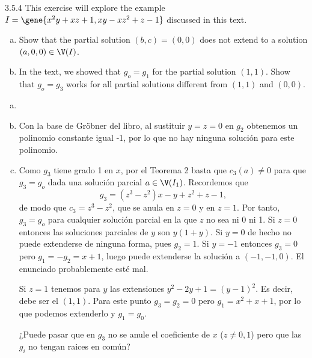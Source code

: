 \documentclass[twoside]{article}
\begin{document}
\begin{ejercicio}{3.5.4}
This exercise will explore the example $I = \gene{x^2y+xz+1, xy-xz^2+z-1}$ discussed in this text.
\begin{enumerate}[a.]
\item Show that the partial solution $(b,c) = (0,0)$ does not extend to a solution $(a,0,0) \in \V(I)$.
\item In the text, we showed that $g_o = g_1$ for the partial solution $(1,1)$.
Show that $g_o = g_3$ works for all partial solutions different from $(1,1)$ and $(0,0)$.
\end{enumerate}
\end{ejercicio}
\begin{solucion}
\begin{enumerate}[a.]
\item[]
\item Con la base de Gröbner del libro, al sustituir $y=z=0$ en $g_2$ obtenemos un polinomio constante igual -1, por lo que no hay ninguna solución para este polinomio. 
\item Como $g_3$ tiene grado 1 en $x$, por el Teorema 2 basta que $c_3(a)\neq 0$ para que $g_3=g_o$ dada una solución parcial $a\in\V(I_1)$. Recordemos que
\[
g_3=(z^3 − z^2)x − y + z^2 + z − 1,
\]
de modo que $c_3=z^3-z^2$, que se anula en $z=0$ y en $z=1$. Por tanto, $g_3=g_o$ para cualquier solución parcial en la que $z$ no sea ni 0 ni 1. Si $z=0$ entonces las soluciones parciales de $y$ son $y(1+y)$. Si $y=0$ de hecho no puede extenderse de ninguna forma, pues $g_2 =1$. Si $y=-1$ entonces $g_3=0$ pero $g_1=-g_2 = x+1$, luego puede extenderse la solución a $(-1,-1,0)$. El enunciado probablemente esté mal.

Si $z=1$ tenemos para $y$ las extensiones $y^2 -2y+1=(y-1)^2$. Es decir, debe ser el $(1,1)$. Para este punto $g_3 = g_2 = 0$ pero $g_1 = x^2+x+1$, por lo que podemos extenderlo y $g_1=g_0$.

¿Puede pasar que en $g_3$ no se anule el coeficiente de $x$ ($z\neq 0,1$) pero que las $g_i$ no tengan raices en común? 
\end{enumerate}
\end{solucion}

\newpage
\end{document}

